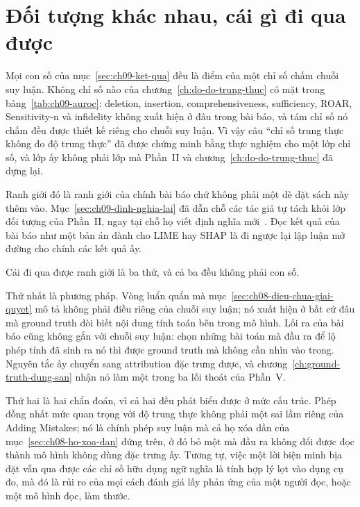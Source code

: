 \section{Đối tượng khác nhau, cái gì đi qua được}
\label{sec:ch09-doi-tuong-khac-nhau}

%
%
Mọi con số của mục~\ref{sec:ch09-ket-qua} đều là điểm của một chỉ số chấm chuỗi
suy luận. Không chỉ số nào của chương~\ref{ch:do-do-trung-thuc} có mặt trong
bảng~\ref{tab:ch09-auroc}: deletion, insertion, comprehensiveness, sufficiency,
ROAR, Sensitivity-n và infidelity không xuất hiện ở đâu trong bài báo, và tám
chỉ số nó chấm đều được thiết kế riêng cho chuỗi suy luận. Vì vậy câu
\enquote{chỉ số trung thực không đo độ trung thực} đã được chứng minh bằng thực
nghiệm cho một lớp chỉ số, và lớp ấy không phải lớp mà Phần~II và
chương~\ref{ch:do-do-trung-thuc} đã dựng lại.

Ranh giới đó là ranh giới của chính bài báo chứ không phải một dè dặt sách này
thêm vào. Mục~\ref{sec:ch09-dinh-nghia-lai} đã dẫn chỗ các tác giả tự tách khỏi
lớp đối tượng của Phần~II, ngay tại chỗ họ viết định nghĩa
mới~\autocite{p21metrics}. Đọc kết quả của bài báo như một bản án dành cho LIME
hay SHAP là đi ngược lại lập luận mở đường cho chính các kết quả ấy.

Cái đi qua được ranh giới là ba thứ, và cả ba đều không phải con số.

Thứ nhất là phương pháp. Vòng luẩn quẩn mà
mục~\ref{sec:ch08-dieu-chua-giai-quyet} mô tả không phải điều riêng của chuỗi
suy luận; nó xuất hiện ở bất cứ đâu mà ground truth đòi biết nội dung tính toán bên
trong mô hình. Lối ra của bài báo cũng không gắn với chuỗi suy luận: chọn
những bài toán mà đầu ra để lộ phép tính đã sinh ra nó thì được ground truth
mà không cần nhìn vào trong. Nguyên tắc ấy chuyển sang attribution đặc trưng
được, và chương~\ref{ch:ground-truth-dung-san} nhận nó làm một trong ba lối
thoát của Phần~V.

Thứ hai là hai chẩn đoán, vì cả hai đều phát biểu được ở mức cấu trúc. Phép
đồng nhất mức quan trọng với độ trung thực không phải một sai lầm riêng của
Adding Mistakes; nó là chính phép suy luận mà cả họ xóa dần của
mục~\ref{sec:ch08-ho-xoa-dan} đứng trên, ở đó bỏ một
 mà đầu ra không
đổi được đọc thành mô hình không dùng đặc trưng ấy. Tương tự, việc một lời
biện minh bịa đặt vẫn qua được các chỉ số hữu dụng ngữ nghĩa là tính hợp lý
lọt vào dụng cụ đo, mà đó là rủi ro của mọi cách đánh giá lấy phản ứng của một
người đọc, hoặc một mô hình đọc, làm thước.

